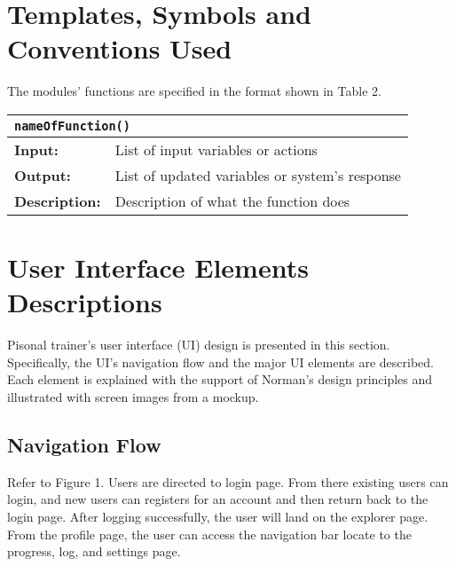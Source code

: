 \documentclass{article}
\newcommand{\name}[1]{\hline \multicolumn{2}{|l|}{\texttt{#1}} }
\newcommand{\inp}[1]{\hline \textbf{Input:} & #1}
\newcommand{\out}[1]{\hline \textbf{Output:} & #1}
\newcommand{\desc}[1]{\hline \textbf{Description:} & #1 }
\newcommand{\fcn}[4]{
    \begin{center}
    \begin{tabular}{|p{2cm} p{10cm}|}
    \hline
    \name{#1} \\
    \inp{#2} \\
    \out{#3} \\
    \desc{#4} \\
    \hline
    \end{tabular}
    \end{center}
}
\begin{document}
\newpage

\clearpage
\setcounter{page}{1}

% 

\section{Templates, Symbols and Conventions Used}
The modules' functions are specified in the format shown in Table 2.

\begingroup
\begin{center}
\fcn
{nameOfFunction()}
{List of input variables or actions}
{List of updated variables or system's response}
{Description of what the function does}
\end{center}
\endgroup

\section{User Interface Elements Descriptions}
 Pisonal trainer’s user interface (UI) design is presented in this section. Specifically, the UI’s navigation flow and the major UI elements are described. Each element is explained with the support of Norman’s design principles and illustrated with screen images from a mockup.

\subsection{Navigation Flow}
Refer to Figure  1. Users are directed to login page. From there existing users can login, and new users can registers for an account and then return back to the login page. After logging successfully, the user will land on the explorer page. From the profile page, the user can access the navigation bar locate to the progress, log, and settings page. 

\begingroup
\begin{center}
\begin{figure}[h]
\end{figure}
\end{center}
\endgroup
\end{document}
